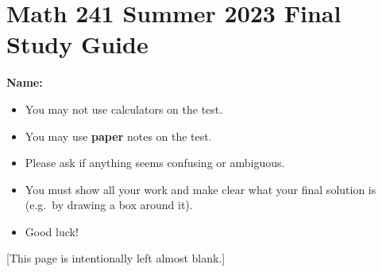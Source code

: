 \documentclass[11pt, addpoints]{exam}
\begin{document}
\section*{Math 241 Summer 2023 Final Study Guide}

\textbf{Name:}

\begin{flushright}
\gradetable[v][questions]
\end{flushright}     

\begin{itemize}
\item You may not use calculators on the test.  
\item You may use \textbf{paper} notes on the test.
\item Please ask if anything seems confusing or ambiguous.
\item You must show all your work and make clear what your final solution is (e.g.\ by drawing a box around it).
\item Good luck!
\end{itemize}

           

\pagebreak

[This page is intentionally left almost blank.]

\pagebreak
\end{document}
